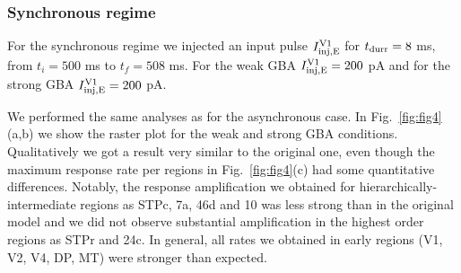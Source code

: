 \subsubsection{Synchronous regime}\label{syncreg} For the synchronous regime we injected an input pulse $I_{\rm inj, E}^{\rm V1}$ for $t_{\rm durr} = 8$ ms, from $t_{i} = 500$ ms to $t_{f} = 508$ ms. For the weak GBA $I_{\rm inj, E}^{\rm V1} = 200$ pA and for the strong GBA $I_{\rm inj, E}^{\rm V1} = 200$ pA.

We performed the same analyses as for the asynchronous case. In Fig.~\ref{fig:fig4}(a,b) we show the raster plot for the weak and strong GBA conditions. Qualitatively we got a result very similar to the original one, even though the maximum response rate per regions in Fig.~\ref{fig:fig4}(c) had some quantitative differences. Notably, the response amplification we obtained for hierarchically-intermediate regions as STPc, 7a, 46d and 10 was less strong than in the original model and we did not observe substantial amplification in the highest order regions as STPr and 24c. In general, all rates we obtained in early regions (V1, V2, V4, DP, MT) were stronger than expected.

